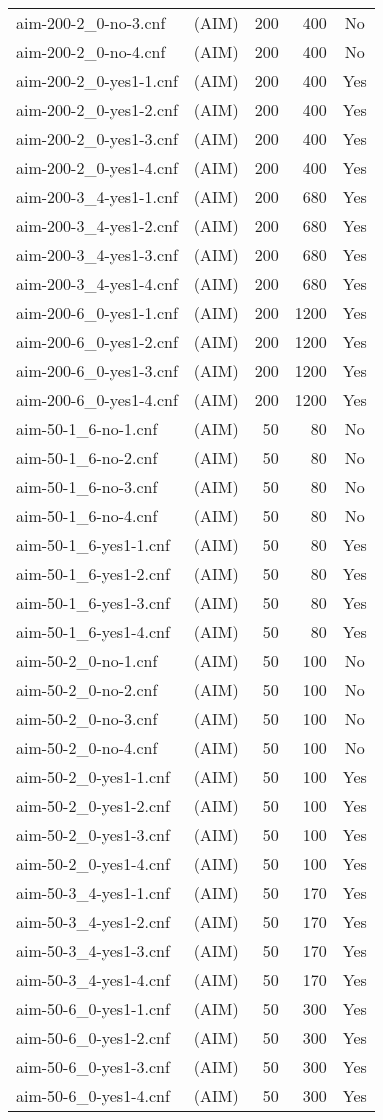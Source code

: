 \begin{supertabular}{|lc|rr|c|}
aim-200-2\_0-no-3.cnf&(AIM)&200&400   &No\\ 
aim-200-2\_0-no-4.cnf&(AIM)&200&400   &No\\ 
aim-200-2\_0-yes1-1.cnf&(AIM)&200&400   &Yes\\
aim-200-2\_0-yes1-2.cnf&(AIM)&200&400   &Yes\\
aim-200-2\_0-yes1-3.cnf&(AIM)&200&400   &Yes\\
aim-200-2\_0-yes1-4.cnf&(AIM)&200&400   &Yes\\
aim-200-3\_4-yes1-1.cnf&(AIM)&200&680   &Yes\\
aim-200-3\_4-yes1-2.cnf&(AIM)&200&680   &Yes\\
aim-200-3\_4-yes1-3.cnf&(AIM)&200&680   &Yes\\
aim-200-3\_4-yes1-4.cnf&(AIM)&200&680   &Yes\\
aim-200-6\_0-yes1-1.cnf&(AIM)&200&1200   &Yes\\
aim-200-6\_0-yes1-2.cnf&(AIM)&200&1200   &Yes\\
aim-200-6\_0-yes1-3.cnf&(AIM)&200&1200   &Yes\\
aim-200-6\_0-yes1-4.cnf&(AIM)&200&1200   &Yes\\
aim-50-1\_6-no-1.cnf&(AIM)&50&80   &No\\  
aim-50-1\_6-no-2.cnf&(AIM)&50&80   &No\\  
aim-50-1\_6-no-3.cnf&(AIM)&50&80   &No\\  
aim-50-1\_6-no-4.cnf&(AIM)&50&80  &No\\  
aim-50-1\_6-yes1-1.cnf&(AIM)&50&80   &Yes\\
aim-50-1\_6-yes1-2.cnf&(AIM)&50&80   &Yes\\
aim-50-1\_6-yes1-3.cnf&(AIM)&50&80   &Yes\\
aim-50-1\_6-yes1-4.cnf&(AIM)&50&80   &Yes\\
aim-50-2\_0-no-1.cnf&(AIM)&50&100   &No\\  
aim-50-2\_0-no-2.cnf&(AIM)&50&100   &No\\  
aim-50-2\_0-no-3.cnf&(AIM)&50&100   &No\\  
aim-50-2\_0-no-4.cnf&(AIM)&50&100   &No\\  
aim-50-2\_0-yes1-1.cnf&(AIM)&50&100   &Yes\\
aim-50-2\_0-yes1-2.cnf&(AIM)&50&100   &Yes\\
aim-50-2\_0-yes1-3.cnf&(AIM)&50&100   &Yes\\
aim-50-2\_0-yes1-4.cnf&(AIM)&50&100   &Yes\\
aim-50-3\_4-yes1-1.cnf&(AIM)&50&170   &Yes\\
aim-50-3\_4-yes1-2.cnf&(AIM)&50&170   &Yes\\
aim-50-3\_4-yes1-3.cnf&(AIM)&50&170   &Yes\\
aim-50-3\_4-yes1-4.cnf&(AIM)&50&170   &Yes\\
aim-50-6\_0-yes1-1.cnf&(AIM)&50&300   &Yes\\
aim-50-6\_0-yes1-2.cnf&(AIM)&50&300   &Yes\\
aim-50-6\_0-yes1-3.cnf&(AIM)&50&300   &Yes\\
aim-50-6\_0-yes1-4.cnf&(AIM)&50&300   &Yes\\
\end{supertabular}

